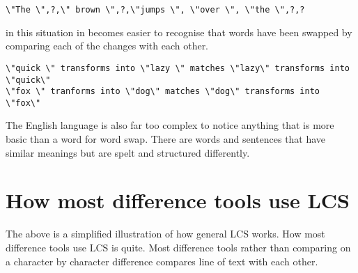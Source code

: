 \begin{verbatim}
\"The \",?,\" brown \",?,\"jumps \", \"over \", \"the \",?,?
\end{verbatim}

in this situation in becomes easier to recognise that words have been swapped by comparing each of the changes with each other.  

\begin{verbatim}
\"quick \" transforms into \"lazy \" matches \"lazy\" transforms into \"quick\"
\"fox \" tranforms into \"dog\" matches \"dog\" transforms into \"fox\" 
\end{verbatim}

The English language is also far too complex to notice anything that is more basic than a word for word swap.
There are words and sentences that have similar meanings but are spelt and structured differently.

 
 



  

\section{How most difference tools use LCS}
The above is a simplified illustration of how general LCS works.
How most difference tools use LCS is quite.
Most difference tools rather than comparing on a character by character difference compares line of text with each other.

% 
 
 


